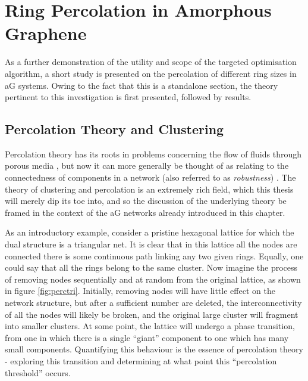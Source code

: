 \section{Ring Percolation in Amorphous Graphene}

As a further demonstration of the utility and scope of the targeted optimisation algorithm, a short study is presented on the percolation of different ring sizes in aG systems.
Owing to the fact that this is a standalone section, the theory pertinent to this investigation is first presented, followed by results.

\subsection{Percolation Theory and Clustering}
\label{s:percolationtheory}

Percolation theory has its roots in problems concerning the flow of fluids through porous media \cite{Broadbent1956}, but now it can more generally be thought of as relating to the connectedness of components in a network (also referred to as \textit{robustness}) \cite{Callaway2000}.
The theory of clustering and percolation is an extremely rich field, which this thesis will merely dip its toe into, and so the discussion of the underlying theory be framed in the context of the aG networks already introduced in this chapter.

As an introductory example, consider a pristine hexagonal lattice for which the dual structure is a triangular net.
It is clear that in this lattice all the nodes are connected \ie{} there is some continuous path linking any two given rings.
Equally, one could say that all the rings belong to the same cluster.
Now imagine the process of removing nodes sequentially and at random from the original lattice, as shown in figure \ref{fig:perctri}.
Initially, removing nodes will have little effect on the network structure, but after a sufficient number are deleted, the interconnectivity of all the nodes will likely be broken, and the original large cluster will fragment into smaller clusters.
At some point, the lattice will undergo a phase transition, from one in which there is a single ``giant'' component to one which has many small components.
Quantifying this behaviour is the essence of percolation theory \-- exploring this transition and determining at what point this ``percolation threshold'' occurs.

